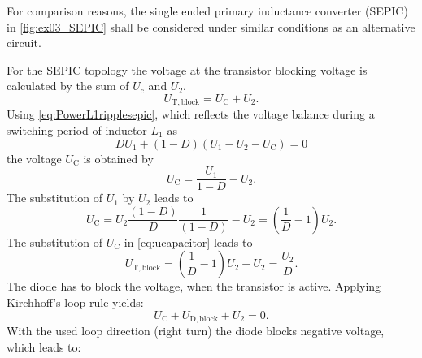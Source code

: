 \vspace{2em}\par
For comparison reasons, the single ended primary inductance converter (SEPIC) in \autoref{fig:ex03_SEPIC} shall be considered under similar conditions as an alternative circuit.



\begin{solutionblock}
    For the SEPIC topology the voltage at the transistor blocking voltage is calculated by the sum of 
    $U_\mathrm{c}$ and $U_\mathrm{2}$.
    \begin{equation}
        U_\mathrm{T,block}=U_\mathrm{C}+U_\mathrm{2}.
    \end{equation}
    Using \eqref{eq:PowerL1ripplesepic}, which reflects the voltage balance during a switching period 
    of inductor $L_1$ as
    \begin{equation}
        DU_\mathrm{1}+\left(1-D\right)\left(U_\mathrm{1}-U_\mathrm{2}-U_\mathrm{C}\right)=0
    \end{equation}
    the voltage $U_\mathrm{C}$ is obtained by
    \begin{equation}
        U_\mathrm{C}=\frac{U_\mathrm{1}}{1-D}-U_\mathrm{2}.
    \end{equation}
    The substitution of $U_\mathrm{1}$ by $U_\mathrm{2}$ leads to
    \begin{equation}
        U_\mathrm{C}=U_\mathrm{2}\frac{\left(1-D\right)}{D}\frac{1}{\left(1-D\right)}-U_\mathrm{2}
        =\left( \frac{1}{D}-1\right) U_\mathrm{2}.
        \label{eq:ucapacitor}        
    \end{equation}
    The substitution of $U_\mathrm{C}$ in \eqref{eq:ucapacitor} leads to 
    \begin{equation}
        U_\mathrm{T,block}=\left( \frac{1}{D}-1\right) U_\mathrm{2}+U_\mathrm{2}=\frac{U_\mathrm{2}}{D}.
    \end{equation}
    The diode has to block the voltage, when the transistor is active. Applying Kirchhoff's loop rule yields:
    \begin{equation}
        U_\mathrm{C}+U_\mathrm{D,block}+U_\mathrm{2}=0.
    \end{equation}
    With the used loop direction (right turn) the diode blocks negative voltage, which leads to:
    \begin{equation}

\end{equation}
\end{solutionblock}
